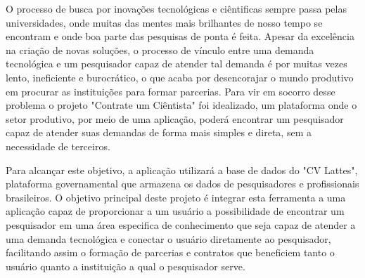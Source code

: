\begin{resumoutfpr}
    O processo de busca por inovações tecnológicas e ciêntificas sempre passa pelas universidades, onde muitas das mentes mais brilhantes de nosso tempo se encontram e onde boa parte das pesquisas de ponta é feita. Apesar da excelência na criação de novas soluções, o processo de vínculo entre uma demanda tecnológica e um pesquisador capaz de atender tal demanda é por muitas vezes lento, ineficiente e burocrático, o que acaba por desencorajar o mundo produtivo em procurar as instituições para formar parcerias. Para vir em socorro desse problema o projeto "Contrate um Ciêntista" foi idealizado, um plataforma onde o setor produtivo, por meio de uma aplicação, poderá encontrar um pesquisador capaz de atender suas demandas de forma mais simples e direta, sem a necessidade de terceiros.

    Para alcançar este objetivo, a aplicação utilizará a base de dados do "CV Lattes", plataforma governamental que armazena os dados de pesquisadores e profissionais brasileiros. O objetivo principal deste projeto é integrar esta ferramenta a uma aplicação capaz de proporcionar a um usuário a possibilidade de encontrar um pesquisador em uma área especifica de conhecimento que seja capaz de atender a uma demanda tecnológica e conectar o usuário diretamente ao pesquisador, facilitando assim o formação de parcerias e contratos que beneficiem tanto o usuário quanto a instituição a qual o pesquisador serve.
\end{resumoutfpr}
